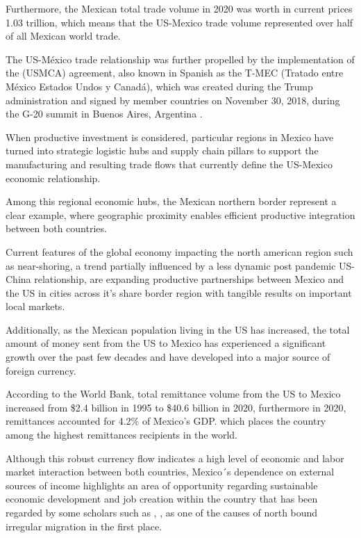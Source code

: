 \documentclass[
]{book}
\begin{document}
Furthermore, the Mexican total trade volume in 2020 was worth in current prices 1.03 trillion,\citep{worldbank2020mexico} which means that the US-Mexico trade volume represented over half of all Mexican world trade.

The US-México trade relationship was further propelled by the implementation of the (USMCA) agreement, also known in Spanish as the T-MEC (Tratado entre México Estados Undos y Canadá), which was created during the Trump administration and signed by member countries on November 30, 2018, during the G-20 summit in Buenos Aires, Argentina \citep{ustr2018usmca}.

When productive investment is considered, particular regions in Mexico have turned into strategic logistic hubs and supply chain pillars to support the manufacturing and resulting trade flows that currently define the US-Mexico economic relationship.

Among this regional economic hubs, the Mexican northern border represent a clear example, where geographic proximity enables efficient productive integration between both countries.

Current features of the global economy impacting the north american region such as near-shoring, a trend partially influenced by a less dynamic post pandemic US-China relationship, are expanding productive partnerships between Mexico and the US in cities across it's share border region with tangible results on important local markets.

Additionally, as the Mexican population living in the US has increased, the total amount of money sent from the US to Mexico has experienced a significant growth over the past few decades and have developed into a major source of foreign currency.

According to the World Bank, total remittance volume from the US to Mexico increased from \$2.4 billion in 1995 to \$40.6 billion in 2020, \citep{worldbank_remittances} furthermore in 2020, remittances accounted for 4.2\% of Mexico's GDP.\citep{bankofmexico_remittances} which places the country among the highest remittances recipients in the world.

Although this robust currency flow indicates a high level of economic and labor market interaction between both countries, Mexico´s dependence on external sources of income highlights an area of opportunity regarding sustainable economic development and job creation within the country that has been regarded by some scholars such as \citep{lopez2020economic}, \citep{1ILEGAL}, as one of the causes of north bound irregular migration in the first place.
\end{document}
